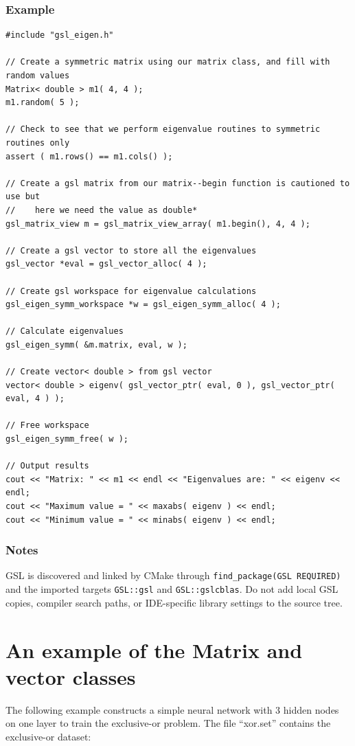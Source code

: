 \documentclass{report}
\begin{document}
\subsubsection{Example}
\begin{verbatim}
#include "gsl_eigen.h"

// Create a symmetric matrix using our matrix class, and fill with
random values
Matrix< double > m1( 4, 4 );
m1.random( 5 );

// Check to see that we perform eigenvalue routines to symmetric
routines only
assert ( m1.rows() == m1.cols() );

// Create a gsl matrix from our matrix--begin function is cautioned to
use but
//    here we need the value as double*
gsl_matrix_view m = gsl_matrix_view_array( m1.begin(), 4, 4 );

// Create a gsl vector to store all the eigenvalues
gsl_vector *eval = gsl_vector_alloc( 4 );

// Create gsl workspace for eigenvalue calculations
gsl_eigen_symm_workspace *w = gsl_eigen_symm_alloc( 4 );

// Calculate eigenvalues
gsl_eigen_symm( &m.matrix, eval, w );

// Create vector< double > from gsl vector
vector< double > eigenv( gsl_vector_ptr( eval, 0 ), gsl_vector_ptr(
eval, 4 ) );

// Free workspace
gsl_eigen_symm_free( w );

// Output results
cout << "Matrix: " << m1 << endl << "Eigenvalues are: " << eigenv <<
endl;
cout << "Maximum value = " << maxabs( eigenv ) << endl;
cout << "Minimum value = " << minabs( eigenv ) << endl;
\end{verbatim}

\subsubsection{Notes}

GSL is discovered and linked by CMake through
\texttt{find\_package(GSL REQUIRED)} and the imported targets
\texttt{GSL::gsl} and \texttt{GSL::gslcblas}.  Do not add local GSL
copies, compiler search paths, or IDE-specific library settings to the
source tree.

\section{An example of the Matrix and vector classes}

The following example constructs a simple neural network with 3 hidden
nodes on one layer to train the exclusive-or problem.  The file
``xor.set'' contains the exclusive-or dataset:
\end{document}
